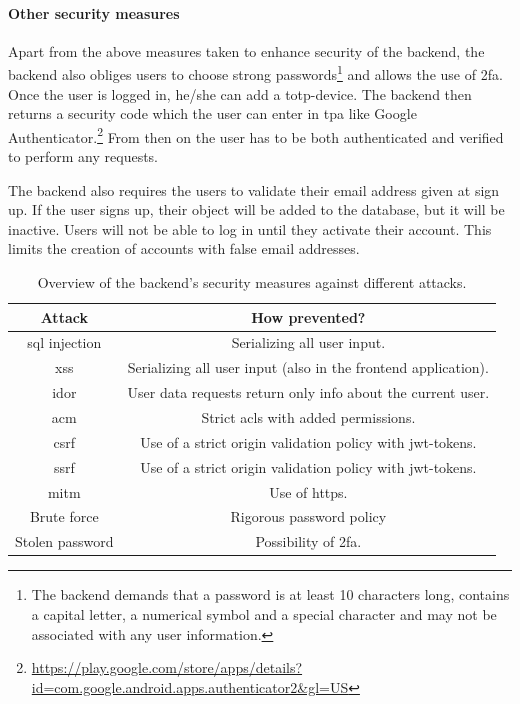 \paragraph{Other security measures}
Apart from the above measures taken to enhance security of the backend, the backend also obliges users to choose strong passwords\footnote{The backend demands that a password is at least 10 characters long, contains a capital letter, a numerical symbol and a special character and may not be associated with any user information.} and allows the use of \ac{2fa}. Once the user is logged in, he/she can add a \ac{totp}-device. The backend then returns a security code which the user can enter in \ac{tpa} like Google Authenticator.\footnote{\url{https://play.google.com/store/apps/details?id=com.google.android.apps.authenticator2&gl=US}} From then on the user has to be both authenticated and verified to perform any requests. 

\ind The backend also requires the users to validate their email address given at sign up. If the user signs up, their object will be added to the database, but it will be inactive. Users will not be able to log in until they activate their account. This limits the creation of accounts with false email addresses.

\begin{table}[htp!]
    \centering
    \begin{tabular}{|c|c|}
         \hline
         \textbf{Attack}& \textbf{How prevented?}  \\
         \hline
         \hline
         \ac{sql} injection & Serializing all user input. \\
         \hline
         \ac{xss} & Serializing all user input (also in the frontend application).\\
         \hline
         \ac{idor} & User data requests return only info about the current user. \\
         \hline
         \ac{acm} & Strict \acp{acl} with added permissions. \\
         \hline
         \ac{csrf} & Use of a strict origin validation policy with \ac{jwt}-tokens. \\
         \hline
         \ac{ssrf} & Use of a strict origin validation policy with \ac{jwt}-tokens. \\
         \hline
         \ac{mitm} & Use of \ac{https}. \\
         \hline
         Brute force & Rigorous password policy \\
         \hline
         Stolen password & Possibility of \ac{2fa}. \\ 
         \hline
    \end{tabular}
    \caption{Overview of the backend's security measures against different attacks.}
    \label{tab:backend-security}
\end{table}


